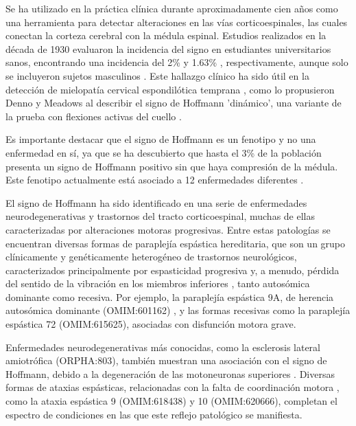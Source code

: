Se ha utilizado en la práctica clínica durante aproximadamente cien años como una herramienta para detectar alteraciones en las vías corticoespinales, las cuales conectan la corteza cerebral con la médula espinal. Estudios realizados en la década de 1930 evaluaron la incidencia del signo en estudiantes universitarios sanos, encontrando una incidencia del 2\% y 1.63\% \cite{echols1936hoffmann} \cite{fay1933clinical}, respectivamente, aunque solo se incluyeron sujetos masculinos \cite{glaser2001cervical}. Este hallazgo clínico ha sido útil en la detección de mielopatía cervical espondilótica temprana \cite{denno1991early}, como lo propusieron Denno y Meadows al describir el signo de Hoffmann 'dinámico', una variante de la prueba con flexiones activas del cuello \cite{glaser2001cervical}.

Es importante destacar que el signo de Hoffmann es un fenotipo y no una enfermedad en sí, ya que se ha descubierto que hasta el 3\% de la población presenta un signo de Hoffmann positivo sin que haya compresión de la médula. Este fenotipo actualmente está asociado a 12 enfermedades diferentes \cite{whitney}.

El signo de Hoffmann ha sido identificado en una serie de enfermedades neurodegenerativas y trastornos del tracto corticoespinal, muchas de ellas caracterizadas por alteraciones motoras progresivas. Entre estas patologías se encuentran diversas formas de paraplejía espástica hereditaria, que son un grupo clínicamente y genéticamente heterogéneo de trastornos neurológicos, caracterizados principalmente por espasticidad progresiva y, a menudo, pérdida del sentido de la vibración en los miembros inferiores \cite{Esteves2014}, tanto autosómica dominante como recesiva. Por ejemplo, la paraplejía espástica 9A, de herencia autosómica dominante (OMIM:601162) \cite{10.1093/brain/awv143}, y las formas recesivas como la paraplejía espástica 72 (OMIM:615625), asociadas con disfunción motora grave.

Enfermedades neurodegenerativas más conocidas, como la esclerosis lateral amiotrófica (ORPHA:803), también muestran una asociación con el signo de Hoffmann, debido a la degeneración de las motoneuronas superiores \cite{RIANCHO201927}. Diversas formas de ataxias espásticas, relacionadas con la falta de coordinación motora \cite{Pedroso2022}, como la ataxia espástica 9 (OMIM:618438) y 10 (OMIM:620666), completan el espectro de condiciones en las que este reflejo patológico se manifiesta.

